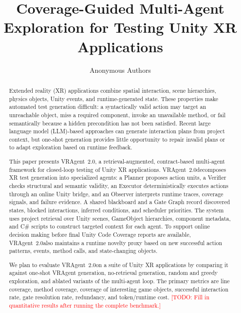 \documentclass[10pt,conference]{IEEEtran}
\newcommand{\todo}[1]{\textcolor{red}{[TODO: #1]}}
\newcommand{\tool}{VRAgent~2.0}
\begin{document}
\title{Coverage-Guided Multi-Agent Exploration for Testing Unity XR Applications}

\author{Anonymous Authors}

\maketitle

\begin{abstract}
Extended reality (XR) applications combine spatial interaction, scene hierarchies,
physics objects, Unity events, and runtime-generated state. These properties make
automated test generation difficult: a syntactically valid action may target an
unreachable object, miss a required component, invoke an unavailable method, or
fail semantically because a hidden precondition has not been satisfied. Recent
large language model (LLM)-based approaches can generate interaction plans from
project context, but one-shot generation provides little opportunity to repair
invalid plans or to adapt exploration based on runtime feedback.

This paper presents \tool, a retrieval-augmented, contract-based multi-agent
framework for closed-loop testing of Unity XR applications. \tool decomposes XR
test generation into specialized agents: a Planner proposes action units, a
Verifier checks structural and semantic validity, an Executor deterministically
executes actions through an online Unity bridge, and an Observer interprets
runtime traces, coverage signals, and failure evidence. A shared blackboard and a
Gate Graph record discovered states, blocked interactions, inferred conditions,
and scheduler priorities. The system uses project retrieval over Unity scenes,
GameObject hierarchies, component metadata, and C\# scripts to construct
targeted context for each agent. To support online decision making before final
Unity Code Coverage reports are available, \tool also maintains a runtime
novelty proxy based on new successful action patterns, events, method calls, and
state-changing objects.

We plan to evaluate \tool on a suite of Unity XR applications by comparing it
against one-shot VRAgent generation, no-retrieval generation, random and greedy
exploration, and ablated variants of the multi-agent loop. The primary metrics
are line coverage, method coverage, coverage of interesting game objects,
successful interaction rate, gate resolution rate, redundancy, and token/runtime
cost. \todo{Fill in quantitative results after running the complete benchmark.}
\end{abstract}
\end{document}
